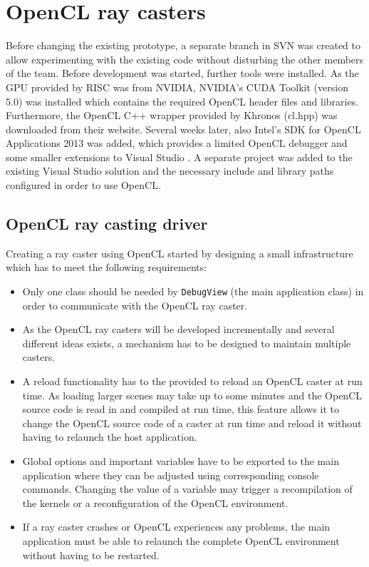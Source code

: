 \chapter{OpenCL ray casters}
\label{sec:opencl_caster}

Before changing the existing prototype, a separate branch in SVN was created to allow experimenting with the existing code without disturbing the other members of the team. Before development was started, further tools were installed. As the GPU provided by RISC was from NVIDIA, NVIDIA's CUDA Toolkit (version 5.0) was installed which contains the required OpenCL header files and libraries. Furthermore, the OpenCL C++ wrapper provided by Khronos (cl.hpp) was downloaded from their website. Several weeks later, also Intel's SDK for OpenCL Applications 2013 was added, which provides a limited OpenCL debugger and some smaller extensions to Visual Studio \cite{intel_opencl_sdk}. A separate project was added to the existing Visual Studio solution and the necessary include and library paths configured in order to use OpenCL.

\section{OpenCL ray casting driver}

Creating a ray caster using OpenCL started by designing a small infrastructure which has to meet the following requirements:

\begin{itemize}
	\item Only one class should be needed by \lstinline!DebugView!  (the main application class) in order to communicate with the OpenCL ray caster.
	\item As the OpenCL ray casters will be developed incrementally and several different ideas exists, a mechanism has to be designed to maintain multiple casters. 
	\item A reload functionality has to the provided to reload an OpenCL caster at run time. As loading larger scenes may take up to some minutes and the OpenCL source code is read in and compiled at run time, this feature allows it to change the OpenCL source code of a caster at run time and reload it without having to relaunch the host application.
	\item Global options and important variables have to be exported to the main application where they can be adjusted using corresponding console commands. Changing the value of a variable may trigger a recompilation of the kernels or a reconfiguration of the OpenCL environment.
	\item If a ray caster crashes or OpenCL experiences any problems, the main application must be able to relaunch the complete OpenCL environment without having to be restarted. 
\end{itemize}

